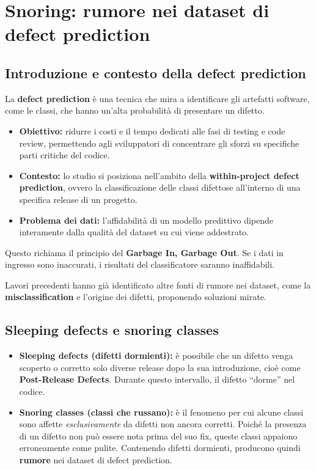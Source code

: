 \chapter{Snoring: rumore nei dataset di defect prediction}

\section{Introduzione e contesto della defect prediction}

La \textbf{defect prediction} è una tecnica che mira a identificare gli artefatti software, come le classi, che hanno un'alta probabilità di presentare un difetto.

\begin{itemize}
    \item \textbf{Obiettivo:} ridurre i costi e il tempo dedicati alle fasi di testing e code review, permettendo agli sviluppatori di concentrare gli sforzi su specifiche parti critiche del codice.
    \item \textbf{Contesto:} lo studio si posiziona nell'ambito della \textbf{within-project defect prediction}, ovvero la classificazione delle classi difettose all'interno di una specifica release di un progetto.
    \item \textbf{Problema dei dati:} l'affidabilità di un modello predittivo dipende interamente dalla qualità del dataset su cui viene addestrato.
\end{itemize}

\begin{notaprof}
Questo richiama il principio del \textbf{Garbage In, Garbage Out}. Se i dati in ingresso sono inaccurati, i risultati del classificatore saranno inaffidabili.
\end{notaprof}

\begin{notaslide}
Lavori precedenti hanno già identificato altre fonti di rumore nei dataset, come la \textbf{misclassification} e l'origine dei difetti, proponendo soluzioni mirate.
\end{notaslide}

\section{Sleeping defects e snoring classes}

\begin{itemize}
    \item \textbf{Sleeping defects (difetti dormienti):} è possibile che un difetto venga scoperto o corretto solo diverse release dopo la sua introduzione, cioè come \textbf{Post-Release Defects}. Durante questo intervallo, il difetto ``dorme'' nel codice.
    \item \textbf{Snoring classes (classi che russano):} è il fenomeno per cui alcune classi sono affette \emph{esclusivamente} da difetti non ancora corretti. Poiché la presenza di un difetto non può essere nota prima del suo fix, queste classi appaiono erroneamente come pulite. Contenendo difetti dormienti, producono quindi \textbf{rumore} nei dataset di defect prediction.
\end{itemize}

